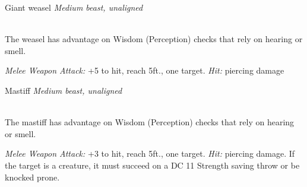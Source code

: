 \documentclass[10pt,twoside,twocolumn,openany]{book}
\begin{document}
\begin{monsterboxnobg}{Giant weasel}
	\textit{Medium beast, unaligned}\\
	\hline
	\basics[
		armorclass	= 13,
		hitpoints 		= \dice{2d8},
		speed		= {40 ft.}
	]
	\hline
	\stats[
		STR	= \stat{11},
		DEX	= \stat{16},
		CON	= \stat{10},
		INT	= \stat{4},
		WIS	= \stat{12},
		CHA	= \stat{5}
	]
	\hline
	\details[
		skills			= {Perception +3, Stealth +5},
		senses 		= {darkvision 60 ft. passive Perception 13},
		languages		= {-},
		challenge		= 1/8
	]
	\hline \\[1mm]
	\begin{monsteraction}
		The weasel has advantage on Wisdom (Perception) checks that rely on hearing or smell.
	\end{monsteraction}
	\begin{monsteraction}[Bite]
		\textit{Melee Weapon Attack:} +5 to hit, reach 5ft., one target. \textit{Hit:}  piercing damage
	\end{monsteraction}
\end{monsterboxnobg}

\begin{monsterboxnobg}{Mastiff}
	\textit{Medium beast, unaligned}\\
	\hline
	\basics[
		armorclass	= 12,
		hitpoints 		= \dice{1d8 + 1},
		speed		= {40 ft.}
	]
	\hline
	\stats[
		STR	= \stat{13},
		DEX	= \stat{14},
		CON	= \stat{12},
		INT	= \stat{3},
		WIS	= \stat{12},
		CHA	= \stat{7}
	]
	\hline
	\details[
		skills			= {Perception +3},
		senses		= {passive Perception 13},
		languages		= {-},
		challenge		= 1/8
	]
	\hline \\[1mm]
	\begin{monsteraction}
		The mastiff has advantage on Wisdom (Perception) checks that rely on hearing or smell.
	\end{monsteraction}
	\begin{monsteraction}[Bite]
		\textit{Melee Weapon Attack:} +3 to hit, reach 5ft., one target. \textit{Hit:}  piercing damage. If the target is a creature, it must succeed on a DC 11 Strength saving throw or be knocked prone.
	\end{monsteraction}
\end{monsterboxnobg}
\end{document}
